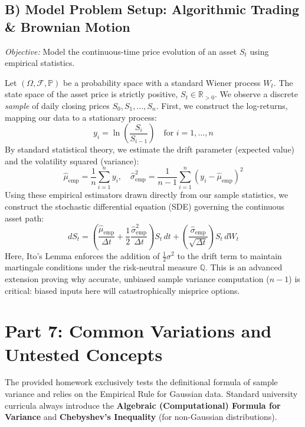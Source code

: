 \documentclass[11pt]{article}
\theoremstyle{definition}
\theoremstyle{remark}
\newcommand{\R}{\mathbb{R}}
\newcommand{\Prob}{\mathbb{P}}
\newcommand{\F}{\mathcal{F}}
\begin{document}
\subsection{B) Model Problem Setup: Algorithmic Trading \& Brownian Motion}
\textit{Objective:} Model the continuous-time price evolution of an asset $S_t$ using empirical statistics.

Let $(\Omega, \F, \Prob)$ be a probability space with a standard Wiener process $W_t$. The state space of the asset price is strictly positive, $S_t \in \R_{>0}$. 
We observe a discrete \textit{sample} of daily closing prices $S_0, S_1, \dots, S_n$. 
First, we construct the log-returns, mapping our data to a stationary process:
\[ y_i = \ln\left(\frac{S_i}{S_{i-1}}\right) \quad \text{for } i = 1, \dots, n \]
By standard statistical theory, we estimate the drift parameter (expected value) and the volatility squared (variance):
\[ \hat{\mu}_{\text{emp}} = \frac{1}{n}\sum_{i=1}^n y_i, \quad \hat{\sigma}^2_{\text{emp}} = \frac{1}{n-1}\sum_{i=1}^n (y_i - \hat{\mu}_{\text{emp}})^2 \]
Using these empirical estimators drawn directly from our sample statistics, we construct the stochastic differential equation (SDE) governing the continuous asset path:
\[ dS_t = \left( \frac{\hat{\mu}_{\text{emp}}}{\Delta t} + \frac{1}{2}\frac{\hat{\sigma}^2_{\text{emp}}}{\Delta t} \right) S_t \, dt + \left( \frac{\hat{\sigma}_{\text{emp}}}{\sqrt{\Delta t}} \right) S_t \, dW_t \]
Here, Ito's Lemma enforces the addition of $\frac{1}{2}\sigma^2$ to the drift term to maintain martingale conditions under the risk-neutral measure $\mathbb{Q}$. This is an advanced extension proving why accurate, unbiased sample variance computation ($n-1$) is critical: biased inputs here will catastrophically misprice options.


\section{Part 7: Common Variations and Untested Concepts}

The provided homework exclusively tests the definitional formula of sample variance and relies on the Empirical Rule for Gaussian data. Standard university curricula always introduce the \textbf{Algebraic (Computational) Formula for Variance} and \textbf{Chebyshev's Inequality} (for non-Gaussian distributions).
\end{document}
